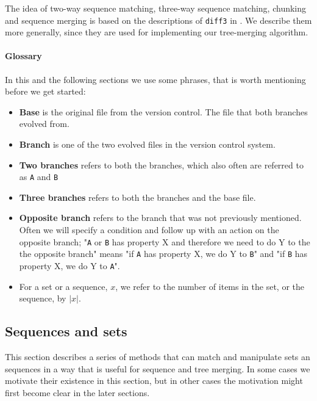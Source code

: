 \documentclass[11pt]{article}
\begin{document}
The idea of two-way sequence matching, three-way sequence matching, chunking and sequence merging is based on the descriptions of \texttt{diff3} in \citet{Khanna}. We describe them more generally, since they are used for implementing our tree-merging algorithm.

\paragraph{Glossary} In this and the following sections we use some phrases, that is worth mentioning before we get started:
\begin{itemize}
\item \textbf{Base} is the original file from the version control. The file that both branches evolved from.
\item \textbf{Branch} is one of the two evolved files in the version control system.
\item \textbf{Two branches} refers to both the branches, which also often are referred to as \texttt{A} and \texttt{B}
\item \textbf{Three branches} refers to both the branches and the base file.
\item \textbf{Opposite branch} refers to the branch that was not previously mentioned. Often we will specify a condition and follow up with an action on the opposite branch; "\texttt{A} or \texttt{B} has property X and therefore we need to do Y to the the opposite branch" means "if \texttt{A} has property X, we do Y to \texttt{B}" and "if \texttt{B} has property X, we do Y to \texttt{A}".
\item For a set or a sequence, $x$, we refer to the number of items in the set, or the sequence, by $|x|$.
\end{itemize}

\subsection{Sequences and sets}
\label{UtilitiyMethods}
This section describes a series of methods that can match and manipulate sets an sequences in a way that is useful for sequence and tree merging. In some cases we motivate their existence in this section, but in other cases the motivation might first become clear in the later sections.
\end{document}
